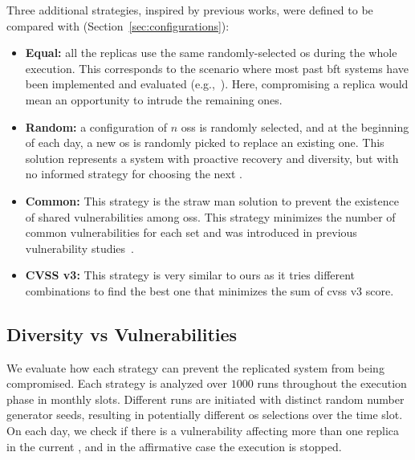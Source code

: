 Three additional strategies, inspired by previous works, were defined to be compared with \system (Section~\ref{sec:configurations}):

\begin{itemize}

\item \textbf{Equal:} all the replicas use the same randomly-selected \gls{os} during the whole execution. 
This corresponds to the scenario where most past \gls{bft} systems have been implemented and evaluated (e.g.,~\cite{Kotla:2010,Aublin:2015,Behl:2015,Veronese:2013,Behl:2017,Liu:2016,Yin:2003,Amir:2011,Bessani:2014,Clement:2009b}). 
Here, compromising a replica would mean an opportunity to intrude the remaining ones.

\item \textbf{Random:} a configuration of $n$ \glspl{os} is randomly selected, and at the beginning of each day, a new \gls{os} is randomly picked to replace an existing one. 
This solution represents a system with proactive recovery and diversity, but with no informed strategy for choosing the next \configuration.

\item \textbf{Common:} This strategy is the straw man solution to prevent the existence of shared vulnerabilities among \glspl{os}. 
This strategy minimizes the number of common vulnerabilities for each set and was introduced in previous vulnerability studies~\cite{Garcia:2013}.

\item \textbf{CVSS v3:} This strategy is very similar to ours as it tries different combinations to find the best one that minimizes the sum of \gls{cvss} v3 score.


\end{itemize}


\subsection{Diversity vs Vulnerabilities}
We evaluate how each strategy can prevent the replicated system from being compromised. 
Each strategy is analyzed over $1000$ runs throughout the execution phase in monthly slots. 
Different runs are initiated with distinct random number generator seeds, resulting in potentially different \gls{os} selections over the time slot. 
On each day, we check if there is a vulnerability affecting more than one replica in the current \configuration, and in the affirmative case the execution is stopped.

